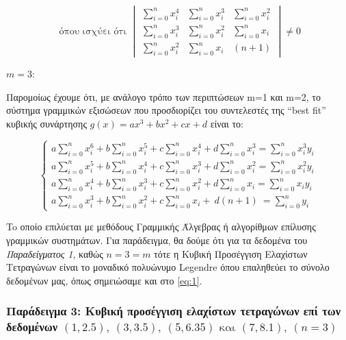 \documentclass[12pt]{article}
\begin{document}
\[
\text{ όπου ισχύει ότι } \begin{vmatrix}
\sum_{i=0}^n x_i^4 & \sum_{i=0}^n x_i^3 & \sum_{i=0}^n x_i^2 \\
\sum_{i=0}^n x_i^3 & \sum_{i=0}^n x_i^2 & \sum_{i=0}^n x_i \\
\sum_{i=0}^n x_i^2 & \sum_{i=0}^n x_i & (n+1)
\end{vmatrix} \ne 0 \nonumber
\]

{\Large $m=3$:}

Παρομοίως έχουμε ότι, με ανάλογο τρόπο των περιπτώσεων m=1 και m=2, το
σύστημα γραμμικών εξισώσεων που προσδιορίζει του συντελεστές της ``best
fit'' κυβικής συνάρτησης \(g(x)=ax^3+bx^2+cx+d\) είναι το:

\[
\begin{cases}
a\sum_{i=0}^n x_i^6+b\sum_{i=0}^n x_i^5+c\sum_{i=0}^n x_i^4+d\sum_{i=0}^n x_i^3 = \sum_{i=0}^n x_i^3y_i \nonumber \\
a\sum_{i=0}^n x_i^5+b\sum_{i=0}^n x_i^4+c\sum_{i=0}^n x_i^3 +d\sum_{i=0}^n x_i^2 = \sum_{i=0}^n x_i^2y_i \nonumber \\
a\sum_{i=0}^n x_i^4+b\sum_{i=0}^n x_i^3+ c\sum_{i=0}^n x_i^2+d\sum_{i=0}^n x_i= \sum_{i=0}^n x_iy_i \nonumber \\
a\sum_{i=0}^n x_i^3+b\sum_{i=0}^n x_i^2+ c\sum_{i=0}^n x_i+ \ d(n+1) \ = \sum_{i=0}^n y_i
\end{cases} \nonumber
\]

To οποίο επιλύεται με μεθόδους Γραμμικής Άλγεβρας ή αλγορίθμων επίλυσης
γραμμικών συστημάτων. Για παράδειγμα, θα δούμε ότι για τα δεδομένα του
\emph{Παραδείγματος 1}, καθώς \(n=3=m\) τότε η Κυβική Προσέγγιση
Ελαχίστων Τετραγώνων είναι το μοναδικό πολυώνυμο Legendre όπου
επαληθεύει το σύνολο δεδομένων μας, όπως σημειώσαμε και στο \eqref{eq:1}.

\subsubsection{Παράδειγμα 3: Κυβική προσέγγιση ελαχίστων
τετραγώνων επί των δεδομένων
\((1, 2.5), \ (3, 3.5), \ (5, 6.35) \text{ και } (7, 8.1), \ (n=3)\)}
\end{document}
